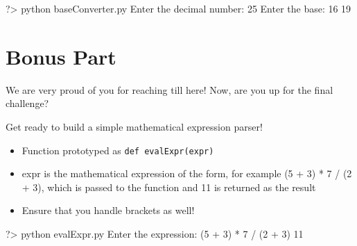 \documentclass{42-en}
\begin{document}
		\begin{42console}
			?> python baseConverter.py
			Enter the decimal number: 25
			Enter the base: 16
			19
		\end{42console}





\chapter{Bonus Part}
	We are very proud of you for reaching till here! Now, are you up for the final challenge?\\

\exnumber{\exercicenumber}

\makeheaderfiles

Get ready to build a simple mathematical expression parser!

		\begin{itemize}\itemsep1pt
			\item Function prototyped as \texttt{def evalExpr(expr)}
			\item expr is the mathematical expression of the form, for example (5 + 3) * 7 / (2 + 3), which is passed to the function and 11 is returned as the result
			\item Ensure that you handle brackets as well!
        	\end{itemize}
	
		\begin{42console}
			?> python evalExpr.py
			Enter the expression: (5 + 3) * 7 / (2 + 3)
			11
		\end{42console}

\end{document}
